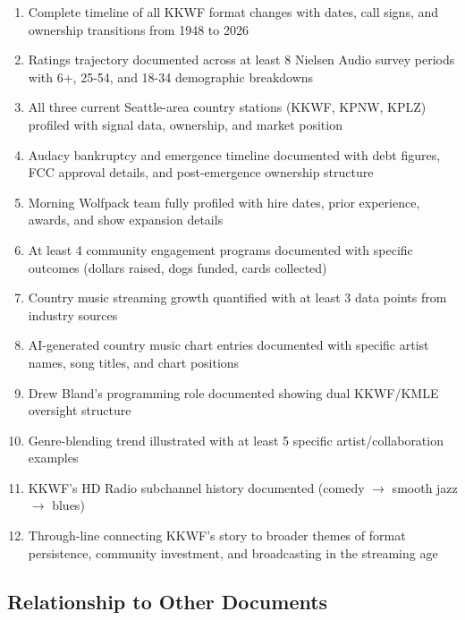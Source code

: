 \documentclass[11pt,letterpaper]{article}
\begin{document}
\begin{enumerate}[leftmargin=2em]
\item Complete timeline of all KKWF format changes with dates, call signs, and ownership transitions from 1948 to 2026
\item Ratings trajectory documented across at least 8 Nielsen Audio survey periods with 6+, 25-54, and 18-34 demographic breakdowns
\item All three current Seattle-area country stations (KKWF, KPNW, KPLZ) profiled with signal data, ownership, and market position
\item Audacy bankruptcy and emergence timeline documented with debt figures, FCC approval details, and post-emergence ownership structure
\item Morning Wolfpack team fully profiled with hire dates, prior experience, awards, and show expansion details
\item At least 4 community engagement programs documented with specific outcomes (dollars raised, dogs funded, cards collected)
\item Country music streaming growth quantified with at least 3 data points from industry sources
\item AI-generated country music chart entries documented with specific artist names, song titles, and chart positions
\item Drew Bland's programming role documented showing dual KKWF/KMLE oversight structure
\item Genre-blending trend illustrated with at least 5 specific artist/collaboration examples
\item KKWF's HD Radio subchannel history documented (comedy $\rightarrow$ smooth jazz $\rightarrow$ blues)
\item Through-line connecting KKWF's story to broader themes of format persistence, community investment, and broadcasting in the streaming age
\end{enumerate}

\subsection{Relationship to Other Documents}
\end{document}
